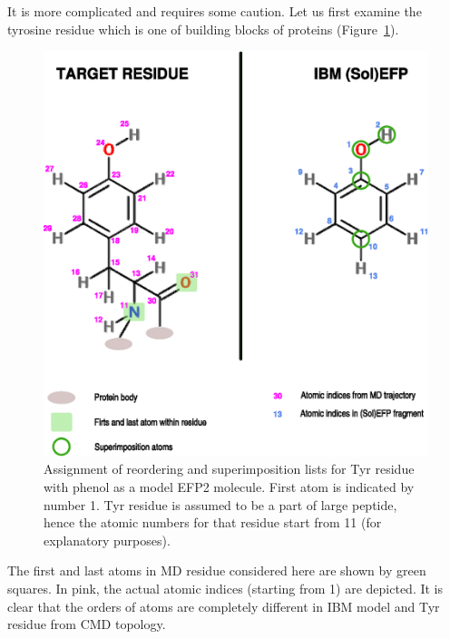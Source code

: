 \documentclass[a4paper,titlepage,twoside,fleqn,12pt]{book}
\begin{document}
\begin{refsection}
It is more complicated and requires some caution. 
Let us first examine the tyrosine residue which is one of
building blocks of proteins (Figure~\ref{f:tyr-res-lists}).
%
\begin{figure}[t!]
\centering
\setlength\fboxsep{0.4pt}
\setlength\fboxrule{0.5pt}
\includegraphics[width=0.92\linewidth]{m.reorder.eps}
\caption{
Assignment of reordering and superimposition lists for Tyr residue
with phenol as a model EFP2 molecule. First atom is indicated by
number 1.
Tyr residue is assumed to be
a part of large peptide, hence the atomic numbers for that residue start
from 11 (for explanatory purposes).
\label{f:tyr-res-lists}}
\end{figure}
%
The first and last atoms in MD residue considered here are shown by green squares. In pink, the actual
atomic indices (starting from 1) are depicted. It is clear that the orders 
of atoms are completely different in IBM model and Tyr residue from CMD topology.


\end{refsection}
\end{document}
